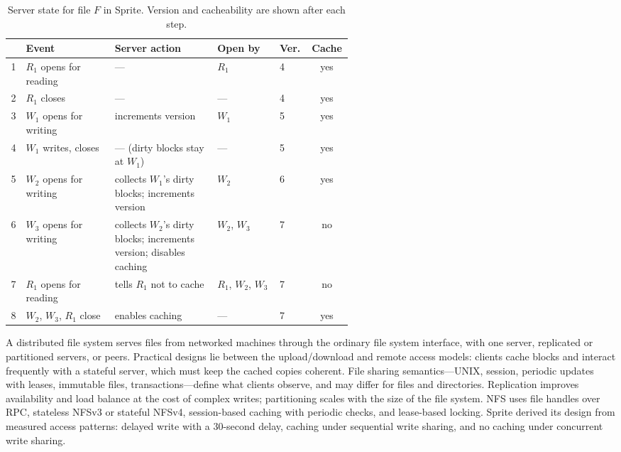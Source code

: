 \documentclass[../main.tex]{subfiles}
\begin{document}
\begin{table}[htbp]
  \centering
  \caption{Server state for file $F$ in Sprite.  Version and
    cacheability are shown after each step.}
  \label{tab:l14-sprite-trace}
  \small
  \begin{tabular}{@{}r>{\raggedright\arraybackslash}p{0.26\linewidth}>{\raggedright\arraybackslash}p{0.3\linewidth}llc@{}}
    \toprule
    & Event & Server action & Open by & Ver. & Cache \\
    \midrule
    1 & $R_1$ opens for reading & --- & $R_1$ & 4 & yes \\
    2 & $R_1$ closes & --- & --- & 4 & yes \\
    3 & $W_1$ opens for writing & increments version & $W_1$ & 5 & yes \\
    4 & $W_1$ writes, closes & --- (dirty blocks stay at $W_1$) & --- & 5
      & yes \\
    5 & $W_2$ opens for writing & collects $W_1$'s dirty blocks; increments
      version & $W_2$ & 6 & yes \\
    6 & $W_3$ opens for writing & collects $W_2$'s dirty blocks; increments
      version; disables caching & $W_2$, $W_3$ & 7 & no \\
    7 & $R_1$ opens for reading & tells $R_1$ not to cache & $R_1$, $W_2$,
      $W_3$ & 7 & no \\
    8 & $W_2$, $W_3$, $R_1$ close & enables caching & --- & 7 & yes \\
    \bottomrule
  \end{tabular}
\end{table}

\begin{keypoint}
  A distributed file system serves files from networked machines through
  the ordinary file system interface, with one server, replicated or
  partitioned servers, or peers.  Practical designs lie between the
  upload/download and remote access models: clients cache blocks and
  interact frequently with a stateful server, which must keep the cached
  copies coherent.  File sharing semantics---UNIX, session, periodic
  updates with leases, immutable files, transactions---define what clients
  observe, and may differ for files and directories.  Replication improves
  availability and load balance at the cost of complex writes;
  partitioning scales with the size of the file system.  NFS uses file
  handles over RPC, stateless NFSv3 or stateful NFSv4, session-based
  caching with periodic checks, and lease-based locking.  Sprite derived
  its design from measured access patterns: delayed write with a
  30-second delay, caching under sequential write sharing, and no caching
  under concurrent write sharing.
\end{keypoint}
\end{document}
